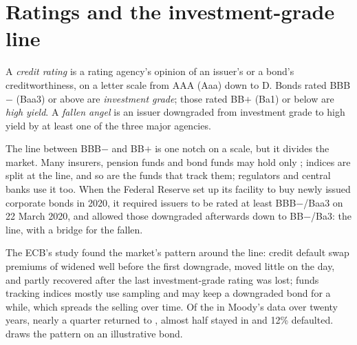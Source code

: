 \section{Ratings and the investment-grade line}

\begin{definition}\label{def:m2:corporate-bonds:rating}
A \emph{credit rating} is a rating agency's opinion of an
issuer's or a bond's creditworthiness, on a letter scale from AAA (Aaa) down to D.
Bonds rated BBB$-$ (Baa3) or above are \emph{investment grade};
those rated BB$+$ (Ba1) or below are \emph{high yield}. A
\emph{fallen angel} is an issuer downgraded from investment
grade to high yield by at least one of the three major agencies.
\end{definition}

The line between BBB$-$ and BB$+$ is one notch on a scale, but it divides the
market. Many insurers, pension funds and bond funds may hold only ; indices are split at the line, and so are the funds that track them;
regulators and central banks use it too. When the Federal Reserve set up its
facility to buy newly issued corporate bonds in 2020, it required issuers to be
rated at least BBB$-$/Baa3 on 22 March 2020, and allowed those downgraded afterwards
down to BB$-$/Ba3: the line, with a bridge for the fallen.

The ECB's study found the market's pattern around the line: credit default swap
premiums of  widened well before the first downgrade, moved little
on the day, and partly recovered after the last investment-grade rating was lost;
funds tracking indices mostly use sampling and may keep a downgraded bond for a
while, which spreads the selling over time. Of the  in Moody's data
over twenty years, nearly a quarter returned to , almost half
stayed in  and 12\% defaulted. 
draws the pattern on an illustrative bond.

